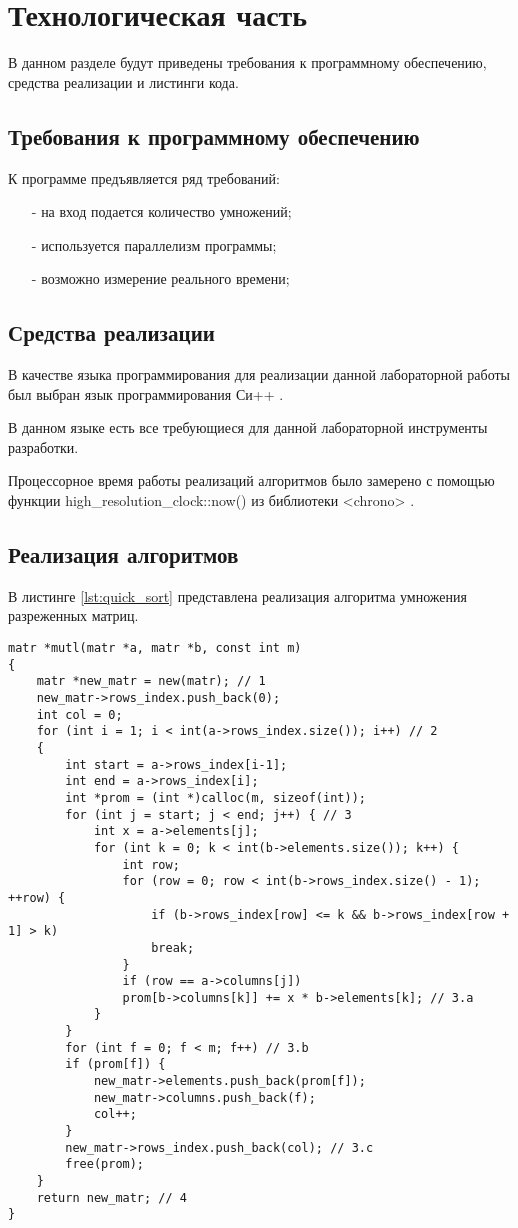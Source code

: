 \chapter{Технологическая часть}

В данном разделе будут приведены требования к программному обеспечению, средства реализации и листинги кода.

\section{Требования к программному обеспечению}

К программе предъявляется ряд требований:
\begin{itemize}
	\item[-] на вход подается количество умножений;
	\item[-] используется параллелизм программы;
	\item[-] возможно измерение реального времени;
\end{itemize}

\section{Средства реализации}

В качестве языка программирования для реализации данной лабораторной работы был выбран язык программирования Си++ \cite{pythonlang}. 

В данном языке есть все требующиеся для данной лабораторной инструменты разработки. 

Процессорное время работы реализаций алгоритмов было замерено с помощью функции high\_resolution\_clock::now() из библиотеки <chrono> \cite{pythonlangtime}.

\section{Реализация алгоритмов}
В листинге \ref{lst:quick_sort} представлена реализация алгоритма умножения разреженных матриц.

\begin{lstlisting}[label=lst:quick_sort,caption=Реализация последовательного алгоритма умножения разреженных матриц]
matr *mutl(matr *a, matr *b, const int m)
{
	matr *new_matr = new(matr); // 1
	new_matr->rows_index.push_back(0);
	int col = 0;
	for (int i = 1; i < int(a->rows_index.size()); i++) // 2
	{
		int start = a->rows_index[i-1];
		int end = a->rows_index[i];
		int *prom = (int *)calloc(m, sizeof(int));
		for (int j = start; j < end; j++) { // 3
			int x = a->elements[j];
			for (int k = 0; k < int(b->elements.size()); k++) {
				int row;
				for (row = 0; row < int(b->rows_index.size() - 1); ++row) {
					if (b->rows_index[row] <= k && b->rows_index[row + 1] > k)
					break;
				}
				if (row == a->columns[j])
				prom[b->columns[k]] += x * b->elements[k]; // 3.a
			}
		}
		for (int f = 0; f < m; f++) // 3.b
		if (prom[f]) {
			new_matr->elements.push_back(prom[f]);
			new_matr->columns.push_back(f);
			col++;
		}
		new_matr->rows_index.push_back(col); // 3.c
		free(prom);
	}
	return new_matr; // 4
}
\end{lstlisting}

